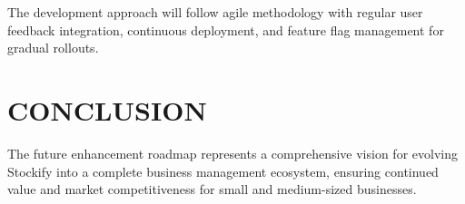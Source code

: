 The development approach will follow agile methodology with regular user feedback integration, continuous deployment, and feature flag management for gradual rollouts.

\section{CONCLUSION}

The future enhancement roadmap represents a comprehensive vision for evolving Stockify into a complete business management ecosystem, ensuring continued value and market competitiveness for small and medium-sized businesses.